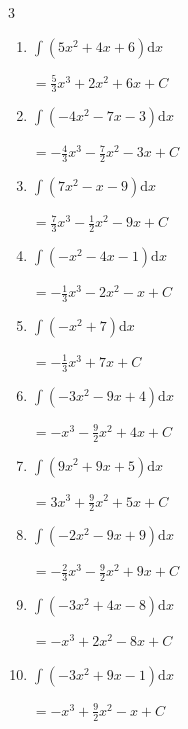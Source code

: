 \begin{multicols}{3}
\begin{enumerate}
        $\displaystyle =-\frac{8}{3}x^{3}+\frac{7}{2}x^{2}-5x+ C$

  \item $\displaystyle \int \left( 5x^{2}+4x+6 \right) \mathrm{d}x$

        $\displaystyle =\frac{5}{3}x^{3}+2x^{2}+6x+ C$

  \item $\displaystyle \int \left( -4x^{2}-7x-3 \right) \mathrm{d}x$

        $\displaystyle =-\frac{4}{3}x^{3}-\frac{7}{2}x^{2}-3x+ C$

  \item $\displaystyle \int \left( 7x^{2}-x-9 \right) \mathrm{d}x$

        $\displaystyle =\frac{7}{3}x^{3}-\frac{1}{2}x^{2}-9x+ C$

  \item $\displaystyle \int \left( -x^{2}-4x-1 \right) \mathrm{d}x$

        $\displaystyle =-\frac{1}{3}x^{3}-2x^{2}-x+ C$

\columnbreak %

  \item $\displaystyle \int \left( -x^{2}+7 \right) \mathrm{d}x$

        $\displaystyle =-\frac{1}{3}x^{3}+7x+ C$

  \item $\displaystyle \int \left( -3x^{2}-9x+4 \right) \mathrm{d}x$

        $\displaystyle =-x^{3}-\frac{9}{2}x^{2}+4x+ C$

  \item $\displaystyle \int \left( 9x^{2}+9x+5 \right) \mathrm{d}x$

        $\displaystyle =3x^{3}+\frac{9}{2}x^{2}+5x+ C$

  \item $\displaystyle \int \left( -2x^{2}-9x+9 \right) \mathrm{d}x$

        $\displaystyle =-\frac{2}{3}x^{3}-\frac{9}{2}x^{2}+9x+ C$

  \item $\displaystyle \int \left( -3x^{2}+4x-8 \right) \mathrm{d}x$

        $\displaystyle =-x^{3}+2x^{2}-8x+ C$

  \item $\displaystyle \int \left( -3x^{2}+9x-1 \right) \mathrm{d}x$

        $\displaystyle =-x^{3}+\frac{9}{2}x^{2}-x+ C$


\end{enumerate}
\end{multicols}
